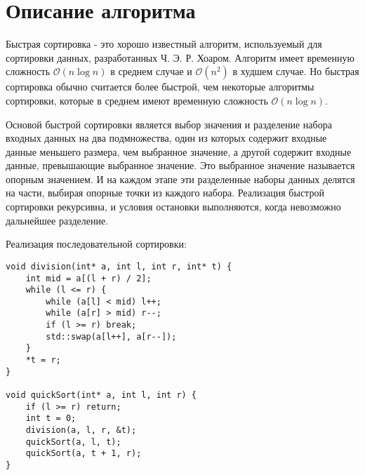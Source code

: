 \documentclass{report}
\begin{document}
\section*{Описание алгоритма}
Быстрая сортировка - это хорошо известный алгоритм, используемый для сортировки данных, разработанных Ч. Э. Р. Хоаром. Алгоритм имеет временную сложность $\mathcal{O}(n\log{}n)$ в среднем случае и $\mathcal{O}(n^2)$ в худшем случае. Но быстрая сортировка обычно считается более быстрой, чем некоторые алгоритмы сортировки, которые в среднем имеют временную сложность $\mathcal{O}(n\log{}n)$.
\par Основой быстрой сортировки является выбор значения и разделение набора входных данных на два подмножества, один из которых содержит входные данные меньшего размера, чем выбранное значение, а другой содержит входные данные, превышающие выбранное значение. Это выбранное значение называется опорным значением. И на каждом этапе эти разделенные наборы данных делятся на части, выбирая опорные точки из каждого набора. Реализация быстрой сортировки рекурсивна, и условия остановки выполняются, когда невозможно дальнейшее разделение. \par Реализация последовательной сортировки:
\par
\begin{lstlisting}
void division(int* a, int l, int r, int* t) {
    int mid = a[(l + r) / 2];
    while (l <= r) {
        while (a[l] < mid) l++;
        while (a[r] > mid) r--;
        if (l >= r) break;
        std::swap(a[l++], a[r--]);
    }
    *t = r;
}

void quickSort(int* a, int l, int r) {
    if (l >= r) return;
    int t = 0;
    division(a, l, r, &t);
    quickSort(a, l, t);
    quickSort(a, t + 1, r);
}
\end{lstlisting}

\newpage

\end{document}
